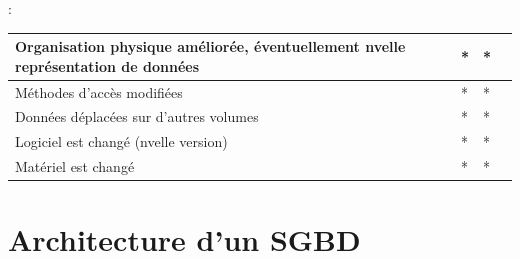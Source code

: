 \documentclass[10pt]{beamer}
\begin{document}
\begin{frame}{\subsecname : \subsubsecname}
\begin{table}[]
{\begin{tabular}{|l|l|l|l|}
                Organisation physique améliorée, éventuellement nvelle représentation de données & *                                 & *                                                                               &                                                                                 \\ \hline
                Méthodes d’accès modifiées                                                       & *                                 & *                                                                               &                                                                                 \\ \hline
                Données déplacées sur d’autres volumes                                           & *                                 & *                                                                               &                                                                                 \\ \hline
                Logiciel est changé (nvelle version)                                             & *                                 & *                                                                               &                                                                                 \\ \hline
                Matériel est changé                                                              & *                                 & *                                                                               &                                                                                 \\ \hline
            \end{tabular}}
    \end{table}
\end{frame}
\section{Architecture d’un SGBD}
\end{document}
